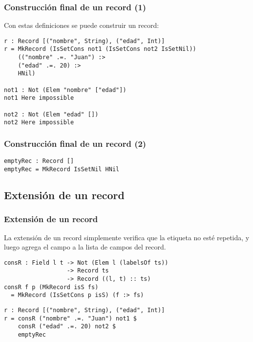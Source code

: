 \documentclass{beamer}
\begin{document}
\begin{frame}[fragile]
\frametitle{Construcción final de un record (1)}

Con estas definiciones se puede construir un record:

\begin{example}
\begin{verbatim}
r : Record [("nombre", String), ("edad", Int)]
r = MkRecord (IsSetCons not1 (IsSetCons not2 IsSetNil)) 
    (("nombre" .=. "Juan") :>
    ("edad" .=. 20) :>
    HNil)

not1 : Not (Elem "nombre" ["edad"])
not1 Here impossible

not2 : Not (Elem "edad" [])
not2 Here impossible
\end{verbatim}
\end{example}
\end{frame}

\begin{frame}[fragile]
\frametitle{Construcción final de un record (2)}

\begin{example}
\begin{verbatim}
emptyRec : Record []
emptyRec = MkRecord IsSetNil HNil
\end{verbatim}
\end{example}

\end{frame}

\subsection{Extensión de un record}

\begin{frame}[fragile]
\frametitle{Extensión de un record}

La extensión de un record simplemente verifica que la etiqueta no esté repetida, y luego agrega el campo a la lista de campos del record.

\pause

\begin{definition}
\begin{verbatim}
consR : Field l t -> Not (Elem l (labelsOf ts))
                  -> Record ts
                  -> Record ((l, t) :: ts)
consR f p (MkRecord isS fs)
  = MkRecord (IsSetCons p isS) (f :> fs)
\end{verbatim}
\end{definition}

\pause
\begin{example}
\begin{verbatim}
r : Record [("nombre", String), ("edad", Int)]
r = consR ("nombre" .=. "Juan") not1 $
    consR ("edad" .=. 20) not2 $
    emptyRec
\end{verbatim}
\end{example}
\end{frame}
\end{document}
